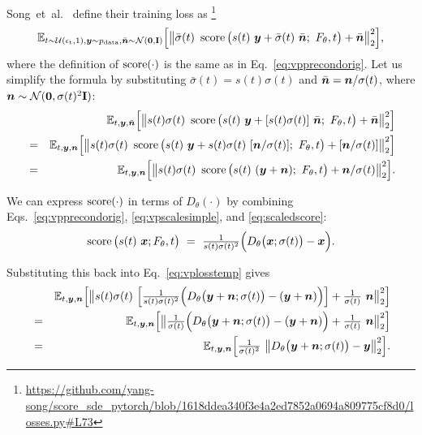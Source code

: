 Song~et~al.~\cite{Song2021sde} define their training loss as%
\footnote{\tiny\url{https://github.com/yang-song/score\_sde\_pytorch/blob/1618ddea340f3e4a2ed7852a0694a809775cf8d0/losses.py\#L73}}
\begin{equation}
  \mathbb{E}_{t \sim \mathcal{U}(\epsilon_\text{t}, 1), \boldsymbol{y} \sim p_\text{data}, \bar{\boldsymbol{n}} \sim \mathcal{N}(\mathbf{0}, \mathbf{I})} \Big[ \big\lVert \bar\sigma(t) ~\operatorname{score}\big( s(t) ~\boldsymbol{y} + \bar\sigma(t) ~\bar{\boldsymbol{n}}; ~F_\theta, t \big) + \bar{\boldsymbol{n}} \big\rVert^2_2 \Big]
  \text{,}
\end{equation}
where the definition of $\operatorname{score}(\cdot)$ is the same as in Eq.~\ref{eq:vpprecondorig}.
Let us simplify the formula by substituting $\bar\sigma(t) = s(t) \sigma(t)$ and $\bar{\boldsymbol{n}} = \boldsymbol{n} / \sigma(t)$, where $\boldsymbol{n} \sim \mathcal{N}(\mathbf{0}, \sigma(t)^2 \mathbf{I})$:
\begin{eqnarray}
  && \mathbb{E}_{t, \boldsymbol{y}, \bar{\boldsymbol{n}}} \Big[ \big\lVert s(t) \sigma(t) ~\operatorname{score}\big( s(t) ~\boldsymbol{y} + [s(t)\sigma(t)] ~\bar{\boldsymbol{n}}; ~F_\theta, t \big) + \bar{\boldsymbol{n}} \big\rVert^2_2 \Big] \\
  &=& \mathbb{E}_{t, \boldsymbol{y}, \boldsymbol{n}} \Big[ \big\lVert s(t) \sigma(t) ~\operatorname{score}\big( s(t) ~\boldsymbol{y} + s(t)\sigma(t) ~[\boldsymbol{n} / \sigma(t)]; ~F_\theta, t \big) + [\boldsymbol{n} / \sigma(t)] \big\rVert^2_2 \Big] \\
  &=& \mathbb{E}_{t, \boldsymbol{y}, \boldsymbol{n}} \Big[ \big\lVert s(t) \sigma(t) ~\operatorname{score}\big( s(t) ~(\boldsymbol{y} + \boldsymbol{n}); ~F_\theta, t \big) + \boldsymbol{n} / \sigma(t) \big\rVert^2_2 \Big]
  \label{eq:vplosstemp}
  \text{.}
\end{eqnarray}

We can express $\operatorname{score}(\cdot)$ in terms of $D_\theta(\cdot)$ by combining Eqs.~\ref{eq:vpprecondorig}, \ref{eq:vpscalesimple}, and \ref{eq:scaledscore}:
\begin{equation}
  \operatorname{score}\big( s(t) ~\boldsymbol{x}; F_\theta, t \big) ~=~ \tfrac{1}{s(t) \sigma(t)^2} \Big( D_\theta \big( \boldsymbol{x}; \sigma(t) \big) - \boldsymbol{x} \Big)
  \text{.}
\end{equation}

Substituting this back into Eq.~\ref{eq:vplosstemp} gives
\begin{eqnarray}
  && \mathbb{E}_{t, \boldsymbol{y}, \boldsymbol{n}} \Big[ \big\lVert s(t) \sigma(t) ~\Big[ \tfrac{1}{s(t) \sigma(t)^2} \Big( D_\theta \big( \boldsymbol{y} + \boldsymbol{n}; \sigma(t) \big) - (\boldsymbol{y} + \boldsymbol{n}) \Big) \Big] + \tfrac{1}{\sigma(t)} ~\boldsymbol{n} \big\rVert^2_2 \Big] \\
  &=& \mathbb{E}_{t, \boldsymbol{y}, \boldsymbol{n}} \Big[ \big\lVert \tfrac{1}{\sigma(t)} \Big( D_\theta \big( \boldsymbol{y} + \boldsymbol{n}; \sigma(t) \big) - (\boldsymbol{y} + \boldsymbol{n}) \Big) + \tfrac{1}{\sigma(t)} ~\boldsymbol{n} \big\rVert^2_2 \Big] \\
  &=& \mathbb{E}_{t, \boldsymbol{y}, \boldsymbol{n}} \Big[ \tfrac{1}{\sigma(t)^2} ~\big\lVert D_\theta \big( \boldsymbol{y} + \boldsymbol{n}; \sigma(t) \big) - \boldsymbol{y} \big\rVert^2_2 \Big]
  \text{.}
\end{eqnarray}

